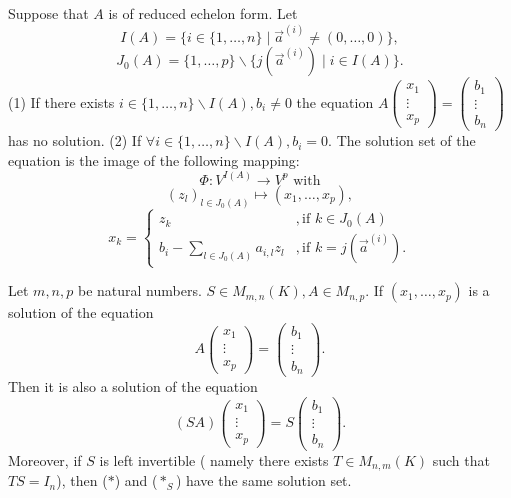 \begin{theoremenv}
    Suppose that $A$ is of reduced echelon form. Let 
    $$I(A)=\{i\in \{1,\dots,n\}\mid \vec{a}^{(i)}\not=(0,\dots,0)\},$$
    $$J_0(A)=\{1,\dots,p\}\backslash\{j\left(\vec{a}^{(i)}\right)\mid i\in I(A)\}.$$
    (1) If there exists $i\in \{1,\dots,n\}\backslash I(A),b_i\not=0$ the equation $A\begin{pmatrix}
 x_1\\
 \vdots\\
x_p
\end{pmatrix}=
\begin{pmatrix}
 b_1\\
 \vdots\\
b_n
\end{pmatrix}$ has no solution.
\newline
(2) If $\forall i\in\{1,\dots ,n\}\backslash I(A),b_i=0$. The solution set of the equation is the image of the following mapping:
$$\Phi:V^{I(A)}\longrightarrow V^p \text{ with}$$
$$(z_l)_{l\in J_0(A)}\longmapsto (x_1,\dots,x_p),$$
$$x_k=\left\{ \begin{matrix}
    z_k &,\text{if } k\in J_0(A)\\
    b_i-\sum_{l\in J_0(A)}a_{i,l}z_l &,\text{if } k=j\left(\vec{a}^{(i)}\right) .
\end{matrix}\right.$$

\end{theoremenv}
\begin{propositionenv}
    Let $m,n,p$ be natural numbers. $S\in M_{m,n}(K), A\in M_{n,p}$. If $(x_1,\dots,x_p)$ is a solution of the equation
    \begin{equation*}
        A\begin{pmatrix}
        x_1\\
        \vdots\\
        x_p
        \end{pmatrix}=\begin{pmatrix}
        b_1\\
        \vdots\\
        b_n
        \end{pmatrix}.\tag{$*$}
    \end{equation*}
    Then it is also a solution of the equation
    \begin{equation*}(SA)\begin{pmatrix}
        x_1\\
        \vdots\\
        x_p
        \end{pmatrix}=S\begin{pmatrix}
        b_1\\
        \vdots\\
        b_n
        \end{pmatrix}.\tag{$*_S$}
        \end{equation*}
    Moreover, if $S$ is left invertible ( namely there exists $T\in M_{n,m}(K)$ such that $TS=I_n$), then ($*$) and ($*_S$) have the same solution set.
\end{propositionenv}
